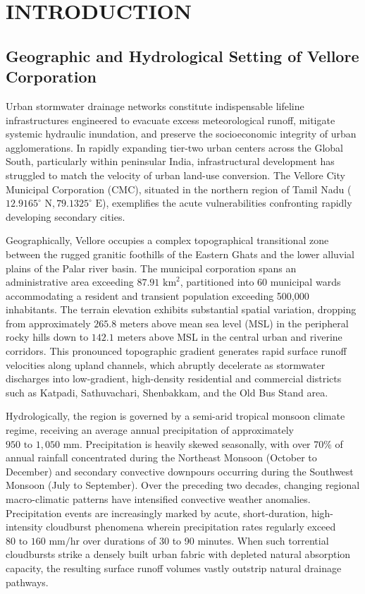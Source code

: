 \chapter{INTRODUCTION}

\section{Geographic and Hydrological Setting of Vellore Corporation}
Urban stormwater drainage networks constitute indispensable lifeline infrastructures engineered to evacuate excess meteorological runoff, mitigate systemic hydraulic inundation, and preserve the socioeconomic integrity of urban agglomerations. In rapidly expanding tier-two urban centers across the Global South, particularly within peninsular India, infrastructural development has struggled to match the velocity of urban land-use conversion. The Vellore City Municipal Corporation (CMC), situated in the northern region of Tamil Nadu ($12.9165^\circ\text{ N}, 79.1325^\circ\text{ E}$), exemplifies the acute vulnerabilities confronting rapidly developing secondary cities. 

Geographically, Vellore occupies a complex topographical transitional zone between the rugged granitic foothills of the Eastern Ghats and the lower alluvial plains of the Palar river basin. The municipal corporation spans an administrative area exceeding $87.91\text{ km}^2$, partitioned into 60 municipal wards accommodating a resident and transient population exceeding 500,000 inhabitants. The terrain elevation exhibits substantial spatial variation, dropping from approximately $265.8\text{ meters}$ above mean sea level (MSL) in the peripheral rocky hills down to $142.1\text{ meters}$ above MSL in the central urban and riverine corridors. This pronounced topographic gradient generates rapid surface runoff velocities along upland channels, which abruptly decelerate as stormwater discharges into low-gradient, high-density residential and commercial districts such as Katpadi, Sathuvachari, Shenbakkam, and the Old Bus Stand area.

Hydrologically, the region is governed by a semi-arid tropical monsoon climate regime, receiving an average annual precipitation of approximately $950\text{ to }1,050\text{ mm}$. Precipitation is heavily skewed seasonally, with over 70\% of annual rainfall concentrated during the Northeast Monsoon (October to December) and secondary convective downpours occurring during the Southwest Monsoon (July to September). Over the preceding two decades, changing regional macro-climatic patterns have intensified convective weather anomalies. Precipitation events are increasingly marked by acute, short-duration, high-intensity cloudburst phenomena wherein precipitation rates regularly exceed $80\text{ to }160\text{ mm/hr}$ over durations of 30 to 90 minutes. When such torrential cloudbursts strike a densely built urban fabric with depleted natural absorption capacity, the resulting surface runoff volumes vastly outstrip natural drainage pathways.

